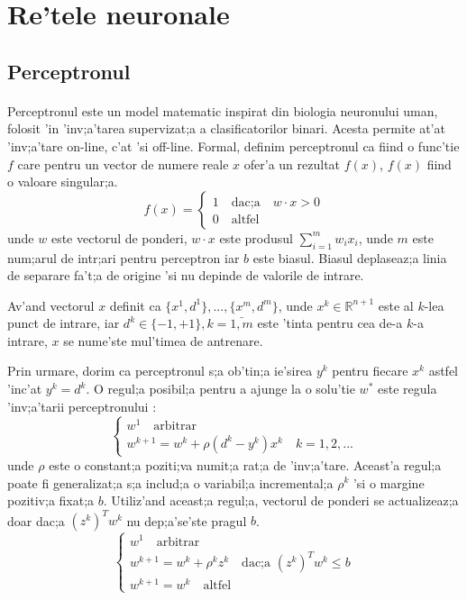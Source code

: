 \section {Re'tele neuronale}

\subsection{Perceptronul}
\paragraph{}

Perceptronul este un model matematic inspirat din biologia neuronului uman, folosit 'in 'inv;a'tarea supervizat;a a clasificatorilor binari. Acesta permite at'at 'inv;a'tare on-line, c'at 'si off-line. Formal, definim perceptronul ca fiind o func'tie $f$ care pentru un vector de numere reale $x$ ofer'a un rezultat $f(x)$, $f(x)$ fiind o valoare singular;a.
\begin{equation}
f(x)= \begin{cases}
		1 \quad \text{dac;a} \quad w \cdot x > 0 \\
		0 \quad \text{altfel}
	\end{cases}
\end{equation}
unde $w$ este vectorul de ponderi, $w \cdot x$ este produsul $\displaystyle \sum_{i=1}^{m} w_{i}x_{i}$, unde $m$ este num;arul de intr;ari pentru perceptron iar $b$ este biasul. Biasul deplaseaz;a linia de separare fa't;a de origine 'si nu depinde de valorile de intrare.
\par
Av'and vectorul $x$ definit ca $\{x^1, d^1\}, ..., \{x^m, d^m\}$, unde $x^k \in \mathbb{R}^{n+1}$ este al $k$-lea punct de intrare, iar $d^k \in \{-1, +1\}, k = \bar{1, m}$ este 'tinta pentru cea de-a $k$-a intrare, $x$ se nume'ste mul'timea de antrenare.
\par
Prin urmare, dorim ca perceptronul s;a ob'tin;a ie'sirea $y^k$ pentru fiecare $x^k$ astfel 'inc'at $y^k = d^k$. O regul;a posibil;a pentru a ajunge la o solu'tie $w^*$ este regula 'inv;a'tarii perceptronului \cite{statlearn}:
\begin{equation}
\begin{cases}
	w^1 \quad \text{arbitrar} \\
	w^{k+1} = w^k + \rho(d^k - y^k)x^k \quad k = 1, 2, ...
\end{cases}
\end{equation}
unde $\rho$ este o constant;a poziti;va numit;a rat;a de 'inv;a'tare. Aceast'a regul;a poate fi generalizat;a s;a includ;a o variabil;a incremental;a $\rho^k$ 'si o margine pozitiv;a fixat;a $b$. Utiliz'and aceast;a regul;a, vectorul de ponderi se actualizeaz;a doar dac;a $(z^k)^Tw^k$ nu dep;a'se'ste pragul $b$.
\begin{equation}
\begin{cases}
w^1 \quad \text{arbitrar} \\
w^{k+1} = w^k + \rho^k z^k \quad \text{dac;a } (z^k)^T w^k \leq b \\
w^{k+1} = w^k  \quad \text{altfel}
\end{cases}
\end{equation}
\newpage
